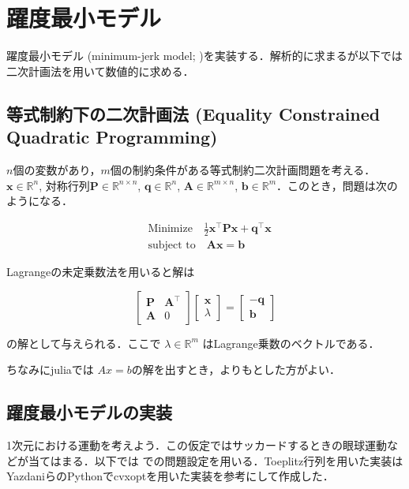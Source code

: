 \section{躍度最小モデル}
躍度最小モデル (minimum-jerk model; \cite{Flash1985-vj})を実装する．解析的に求まるが以下では二次計画法を用いて数値的に求める．

\subsection{等式制約下の二次計画法 (Equality Constrained Quadratic Programming)}

$n$個の変数があり，$m$個の制約条件がある等式制約二次計画問題を考える．$\mathbf {x}\in \mathbb{R}^n$, 対称行列$\mathbf{P}\in \mathbb{R}^{n\times n}$,  $\mathbf {q}\in \mathbb{R}^{n}$, $\mathbf{A}\in \mathbb{R}^{m\times n}$, $\mathbf {b}\in \mathbb{R}^m$．このとき，問題は次のようになる．


\begin{align}
&{\text{Minimize}}\quad {\frac {1}{2}}\mathbf {x}^\top \mathbf{P}\mathbf {x} +\mathbf {q} ^{\top}\mathbf {x}\\
&{\text{subject to}}\quad \mathbf{A}\mathbf {x} =\mathbf {b}
\end{align}


Lagrangeの未定乗数法を用いると解は


\begin{equation}
{\begin{bmatrix}\mathbf{P}&\mathbf{A}^\top\\\mathbf{A}&0\end{bmatrix}}{\begin{bmatrix}\mathbf {x} \\
\lambda \end{bmatrix}}={\begin{bmatrix}-\mathbf {q} \\\mathbf {b} \end{bmatrix}}
\end{equation}


の解として与えられる．ここで $\lambda \in \mathbb{R}^{m}$  はLagrange乗数のベクトルである．


ちなみにjuliaでは $Ax=b$の解を出すとき，よりもとした方がよい．

\subsection{躍度最小モデルの実装}
1次元における運動を考えよう．この仮定ではサッカードするときの眼球運動などが当てはまる．以下では \cite{Yazdani2012-sx} での問題設定を用いる．Toeplitz行列を用いた実装はYazdaniらのPythonでcvxoptを用いた実装を参考にして作成した．

